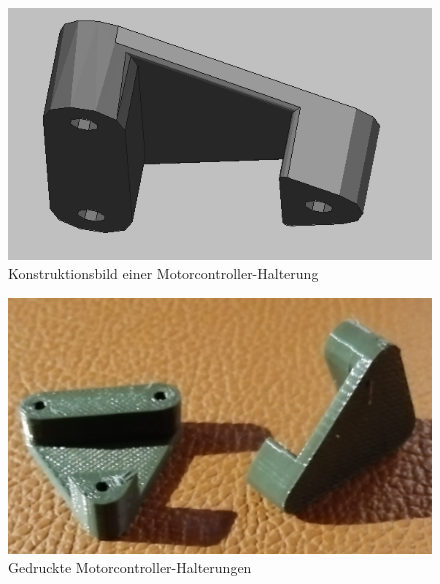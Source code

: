 \begin{minipage}[b]{0.47\textwidth}
\centering
\begin{figure}[H] %
\includegraphics[width=.8\textwidth]{sec2/images/3DAnbaukomponenten/Konstruktionsbilder/MotorcontrollerHalterungKonstruktion} 
\centering
\captionsetup{width=.9\textwidth}
\caption[Konstruktionsbild einer Motorcontroller-Halterung]{Konstruktionsbild einer Motorcontroller-Halterung}
\centering
\label{fig:MotorcontrollerHalterungKonstruktion}
\end{figure}
\end{minipage}
\begin{minipage}[b]{0.47\textwidth}
\begin{figure}[H] %
\includegraphics[width=.9\textwidth]{sec2/images/3DAnbaukomponenten/Druckbilder/MotorcontrollerHalterungDruck} 
\centering
\captionsetup{width=.95\textwidth}
\caption[Gedruckte Motorcontroller-Halterungen]{Gedruckte Motorcontroller-Halterungen}
\centering
\label{fig:MotorcontrollerHalterungDruck}
\end{figure}
\end{minipage}
\vspace{4mm}

